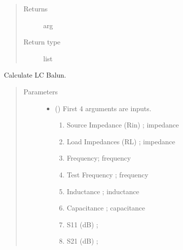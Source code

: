 \documentclass[letterpaper,10pt,english]{sphinxmanual}
\begin{document}
\begin{fulllineitems}
\begin{quote}
\begin{description}
\begin{itemize}
\end{itemize}

\item[{Returns}] \leavevmode
arg

\item[{Return type}] \leavevmode
list

\end{description}\end{quote}

\end{fulllineitems}


\begin{fulllineitems}
\label{\detokenize{components:components.LC_Balun}}
Calculate LC Balun.
\begin{quote}\begin{description}
\item[{Parameters}] \leavevmode\begin{itemize}
\item {} 
 () \textendash{} 
First 4 arguments are inputs.
\begin{enumerate}
%
\item {} 
Source Impedance (Rin) ; impedance

\item {} 
Load Impedances (RL) ; impedance

\item {} 
Frequency; frequency

\item {} 
Test Frequency ; frequency

\item {} 
Inductance ; inductance

\item {} 
Capacitance ; capacitance

\item {} 
S11 (dB) ;

\item {} 
S21 (dB) ;

\end{enumerate}


\end{itemize}
\end{description}
\end{quote}
\end{fulllineitems}
\end{document}
